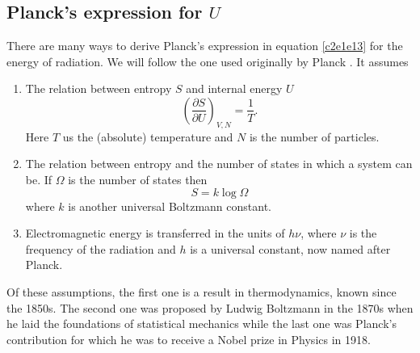 \subsection{Planck's expression for $U$}
There are many ways to derive Planck's expression in equation \eqref{c2e1e13}
for the energy of radiation. We will follow the one used originally by Planck
\cite{planck1901law}. It assumes
\begin{enumerate}
\item The relation between entropy $S$ and internal energy $U$
\begin{equation}\label{c2s1e15}
\left(\frac{\partial S}{\partial U}\right)_{V, N} = \frac{1}{T}.
\end{equation}
Here $T$ us the (absolute) temperature and $N$ is the number of particles.
\item The relation between entropy and the number of states in which a system
can be. If $\Omega$ is the number of states then
\begin{equation}\label{c2s1e16}
S = k\log\Omega
\end{equation}
where $k$ is another universal Boltzmann constant.
\item Electromagnetic energy is transferred in the units of $h\nu$, where $\nu$
is the frequency of the radiation and $h$ is a universal constant, now named 
after Planck.
\end{enumerate}
Of these assumptions, the first one is a result in thermodynamics, known since 
the 1850s. The second one was proposed by Ludwig Boltzmann in the 1870s when he
laid the foundations of statistical mechanics while the last one was Planck's 
contribution for which he was to receive a Nobel prize in Physics in 1918.

